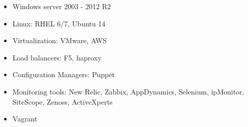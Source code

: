 \begin{multicols}{2}
	\begin{itemize}
		\item Windows server 2003 - 2012 R2
		\item Linux: RHEL 6/7, Ubuntu 14
		\item Virtualization: VMware, AWS
		\item Load balancers: F5, haproxy
		\item Configuration Managers: Puppet
		\item Monitoring tools: New Relic, Zabbix, AppDynamics, Selenium, ipMonitor, SiteScope, Zenoss, ActiveXperts
		\item Vagrant
	\end{itemize}
	\vspace*{\fill}
\end{multicols}